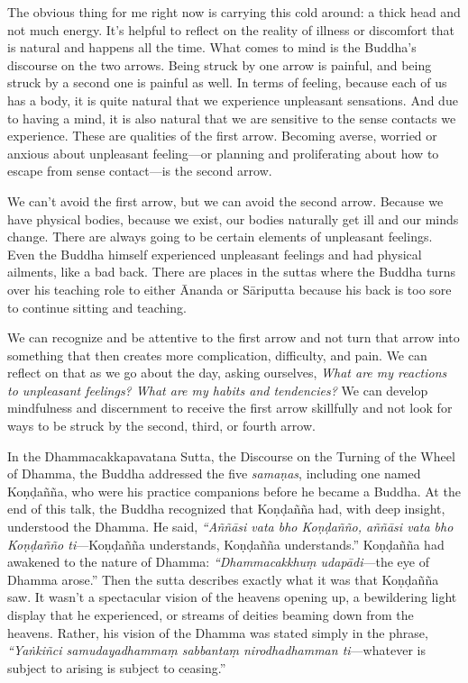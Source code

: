 
The obvious thing for me right now is carrying this cold around: a 
thick head and not much energy. It's helpful to reflect on the reality 
of illness or discomfort that is natural and happens all the time. What 
comes to mind is the Buddha's discourse on the two arrows. Being struck 
by one arrow is painful, and being struck by a second one is painful as 
well. In terms of feeling, because each of us has a body, it is quite 
natural that we experience unpleasant sensations. And due to having a 
mind, it is also natural that we are sensitive to the sense contacts we 
experience. These are qualities of the first arrow. Becoming averse, 
worried or anxious about unpleasant feeling---or planning and 
proliferating about how to escape from sense contact---is the second 
arrow.

We can't avoid the first arrow, but we can avoid the second arrow. 
Because we have physical bodies, because we exist, our bodies naturally 
get ill and our minds change. There are always going to be certain 
elements of unpleasant feelings. Even the Buddha himself experienced 
unpleasant feelings and had physical ailments, like a bad back. There 
are places in the suttas where the Buddha turns over his teaching role 
to either Ānanda or Sāriputta because his back is too sore to 
continue sitting and teaching.

We can recognize and be attentive to the first arrow and not turn that 
arrow into something that then creates more complication, difficulty, 
and pain. We can reflect on that as we go about the day, asking 
ourselves, \emph{What are my reactions to unpleasant feelings? What are 
my habits and tendencies?} We can develop mindfulness and discernment 
to receive the first arrow skillfully and not look for ways to be 
struck by the second, third, or fourth arrow.


In the Dhammacakkapavatana Sutta, the Discourse on the Turning of the 
Wheel of Dhamma, the Buddha addressed the five \emph{samaṇas}, 
including one named Koṇḍañña, who were his practice companions 
before he became a Buddha. At the end of this talk, the Buddha 
recognized that Koṇḍañña had, with deep insight, understood the 
Dhamma. He said, \emph{``Aññāsi vata bho Koṇḍañño, aññāsi 
vata bho Koṇḍañño ti}---Koṇḍañña understands, 
Koṇḍañña understands.'' Koṇḍañña had awakened to the nature 
of Dhamma: \emph{``Dhammacakkhuṃ udapādi}---the eye of Dhamma 
arose.'' Then the sutta describes exactly what it was that 
Koṇḍañña saw. It wasn't a spectacular vision of the heavens 
opening up, a bewildering light display that he experienced, or streams 
of deities beaming down from the heavens. Rather, his vision of the 
Dhamma was stated simply in the phrase, \emph{``Yaṅkiñci 
samudayadhammaṃ sabbantaṃ nirodhadhamman ti}---whatever is subject 
to arising is subject to ceasing.''

